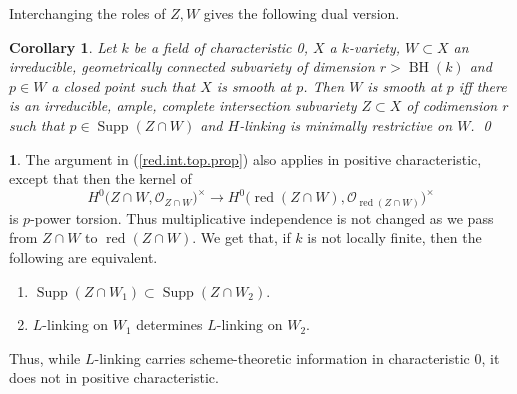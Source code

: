 \documentclass{amsart}
\newtheorem{cor}[thm]{Corollary}
\theoremstyle{definition}
\newtheorem{say}[thm]{}
\theoremstyle{remark}
\renewcommand{\o}[0]{{\mathcal O}}
\newcommand{\supp}[0]{\operatorname{Supp}}
\newcommand{\red}[0]{\operatorname{red}}
\newcommand{\BH}[0]{\operatorname{BH}}
\newcommand{\simsa}[0]{\sim_{\rm sa}}
\begin{document}


Interchanging the roles of $Z,W$ gives the following dual version.


\begin{cor}\label{red.int.top.prop.cor.6}   %
 Let $k$ be a field of characteristic 0,
 $X$  a $k$-variety, $W\subset X$  an irreducible, geometrically connected  subvariety of dimension $r>\BH(k)$ and $p\in W$ a closed point  such that $X$ is smooth at $p$. 
 Then $W$ is smooth at $p$ iff there is an irreducible, ample, complete intersection subvariety $Z\subset X$ 
of codimension $r$
such that $p\in \supp(Z\cap W)$ and 
$H$-linking is minimally restrictive on  $W$. \qed
\end{cor}









\begin{say}\label{red.int.top.prop.p} The    argument in  (\ref{red.int.top.prop}) also applies in positive characteristic, except that then the kernel of
$$
H^0\bigl(Z\cap W, \o_{Z\cap W}\bigr)^{\times}\to H^0\bigl(\red(Z\cap W), \o_{\red(Z\cap W)}\bigr)^{\times}
$$
is $p$-power torsion. Thus multiplicative  independence is not changed
as we pass from $ Z\cap W$ to $\red(Z\cap W) $.  We get that, if $k$ is not locally finite, then the following are equivalent.
\begin{enumerate}
\item $\supp(Z\cap W_1)\subset \supp(Z\cap W_2)$.
\item  $L$-linking on  $W_1$  determines $L$-linking on  $W_2$. 
\end{enumerate}
Thus, while  $L$-linking carries scheme-theoretic information in characteristic 0, it does not in positive characteristic. 
\end{say}
\end{document}
